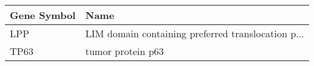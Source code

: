 \begin{tabular}{ll}
\toprule
Gene Symbol &                                               Name \\
\midrule
        LPP & LIM domain containing preferred translocation p... \\
       TP63 &                                  tumor protein p63 \\
\bottomrule
\end{tabular}
